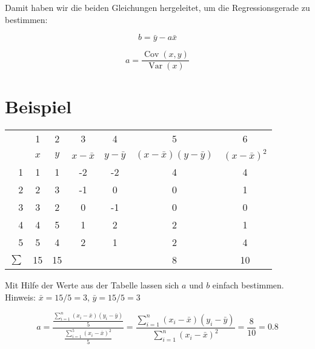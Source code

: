\documentclass[ngerman, 12pt]{scrartcl}
\DeclareMathOperator{\cov}{Cov}
\DeclareMathOperator{\var}{Var}
\begin{document}
Damit haben wir die beiden Gleichungen hergeleitet, um die Regressionsgerade zu bestimmen:

\begin{equation}
b=\bar{y} - a \bar{x}
\end{equation}


\begin{equation}
a =  \dfrac{\cov(x,y)}{\var(x)}
\end{equation}

\clearpage


\section{Beispiel}

\begin{center}
\begin{tabular}{r|cccccc} \toprule
& 1 & 2 & 3 & 4 & 5 & 6 \\
& $x$	&	$y$	&	$x-\bar{x}$	&	$y-\bar{y}$	&	$(x-\bar{x})(y-\bar{y})$	&	$(x-\bar{x})^2$	\\ \midrule
1 & 1	&	1	&	-2	&	-2	&	4	&	4	\\
2 & 2	&	3	&	-1	&	0	&	0	&	1	\\
3 & 3	&	2	&	0	&	-1	&	0	&	0	\\
4 & 4	&	5	&	1	&	2	&	2	&	1	\\
5 & 5	&	4	&	2	&	1	&	2	&	4	\\  \midrule
$\sum$ & 15 & 15 & & & 8 & 10 \\ \bottomrule
\end{tabular}
\end{center}

%

Mit Hilfe der Werte aus der Tabelle lassen sich \(a\) und \(b\) einfach bestimmen. Hinweis: \(\bar x = 15/5 = 3\), \(\bar y = 15/5 = 3\)

\[ a = \frac{\frac{\sum_{i=1}^n \left(x_i-\bar x \right)\left(y_i-\bar y \right)}{5}}{ 
\frac{\sum_{i=1}^5 \left( x_i - \bar x \right)^2}{5}} = \frac{\sum_{i=1}^n\left(x_i-\bar x \right)\left(y_i-\bar y \right)}{\sum_{i=1}^n \left(x_i-\bar x \right)^2}  = \frac{8}{10} = 0.8 \]
\end{document}
